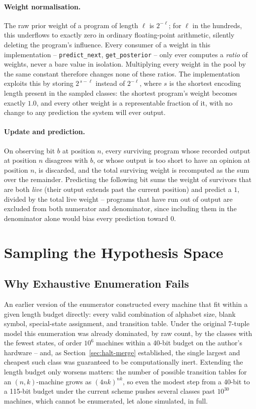 \documentclass[11pt]{article}
\begin{document}
\paragraph{Weight normalisation.} The raw prior weight of a program of length $\ell$ is
$2^{-\ell}$; for $\ell$ in the hundreds, this underflows to exactly zero in ordinary
floating-point arithmetic, silently deleting the program's influence. Every consumer of a
weight in this implementation -- \texttt{predict\_next}, \texttt{get\_posterior} -- only
ever computes a \emph{ratio} of weights, never a bare value in isolation. Multiplying every
weight in the pool by the same constant therefore changes none of these ratios. The
implementation exploits this by storing $2^{\,s-\ell}$ instead of $2^{-\ell}$, where $s$ is
the shortest encoding length present in the sampled classes: the shortest program's weight
becomes exactly $1.0$, and every other weight is a representable fraction of it, with no
change to any prediction the system will ever output.

\paragraph{Update and prediction.} On observing bit $b$ at position $n$, every surviving
program whose recorded output at position $n$ disagrees with $b$, or whose output is too
short to have an opinion at position $n$, is discarded, and the total surviving weight is
recomputed as the sum over the remainder. Predicting the following bit sums the weight of
survivors that are both \emph{live} (their output extends past the current position) and
predict a $1$, divided by the total live weight -- programs that have run out of output
are excluded from both numerator and denominator, since including them in the denominator
alone would bias every prediction toward $0$.

\section{Sampling the Hypothesis Space}
\label{sec:sampling}

\subsection{Why Exhaustive Enumeration Fails}
\label{sec:sampling-fails}

An earlier version of the enumerator constructed every machine that fit within a given
length budget directly: every valid combination of alphabet size, blank symbol,
special-state assignment, and transition table. Under the original 7-tuple model this
enumeration was already dominated, by raw count, by the classes with the fewest states,
of order $10^6$ machines within a 40-bit budget on the author's hardware -- and, as
Section~\ref{sec:halt-merge} established, the single largest and cheapest such class was
guaranteed to be computationally inert. Extending the length budget only worsens matters:
the number of possible transition tables for an $(n,k)$-machine grows as
$(4nk)^{nk}$, so even the modest step from a 40-bit to a 115-bit budget under the current
scheme pushes several classes past $10^{30}$ machines, which cannot be enumerated,
let alone simulated, in full.
\end{document}
